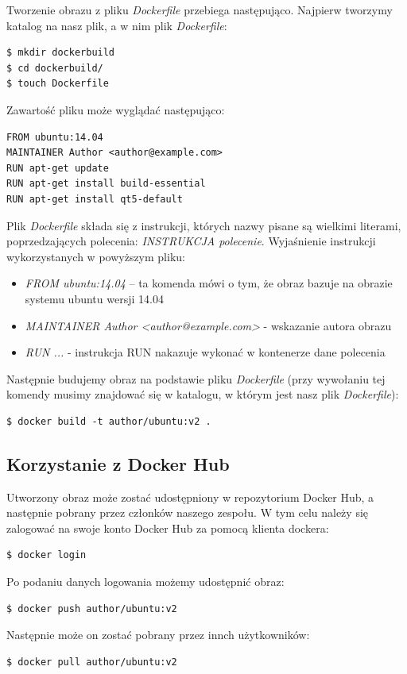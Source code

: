 Tworzenie obrazu z pliku \textit{Dockerfile} przebiega następująco. Najpierw tworzymy katalog na nasz plik, a w nim plik \textit{Dockerfile}:
\begin{lstlisting}[style=incode]
$ mkdir dockerbuild
$ cd dockerbuild/
$ touch Dockerfile
\end{lstlisting}
Zawartość pliku może wyglądać następująco:
\begin{lstlisting}[style=incode]
FROM ubuntu:14.04
MAINTAINER Author <author@example.com>
RUN apt-get update 
RUN apt-get install build-essential 
RUN apt-get install qt5-default
\end{lstlisting}
Plik \textit{Dockerfile} składa się z instrukcji, których nazwy pisane są wielkimi literami, poprzedzających polecenia: \textit{INSTRUKCJA polecenie}. Wyjaśnienie instrukcji wykorzystanych w powyższym pliku:
\begin{itemize}

\item \textit{FROM ubuntu:14.04} – ta komenda mówi o tym, że obraz bazuje na obrazie systemu ubuntu wersji 14.04
\item \textit{MAINTAINER Author <author@example.com>} - wskazanie autora obrazu
\item \textit{RUN ...} - instrukcja RUN nakazuje wykonać w kontenerze dane polecenia
\end{itemize}
Następnie budujemy obraz na podstawie pliku \textit{Dockerfile} (przy wywołaniu tej komendy musimy znajdować się w katalogu, w którym jest nasz plik \textit{Dockerfile}):
\begin{lstlisting}[style=incode]
$ docker build -t author/ubuntu:v2 .
\end{lstlisting}


\subsection{Korzystanie z Docker Hub}

Utworzony obraz może zostać udostępniony w repozytorium Docker Hub, a następnie pobrany przez członków naszego zespołu. W tym celu należy się zalogować na swoje konto Docker Hub za pomocą klienta dockera:
\begin{lstlisting}[style=incode]
$ docker login
\end{lstlisting}
Po podaniu danych logowania możemy udostępnić obraz:
\begin{lstlisting}[style=incode]
$ docker push author/ubuntu:v2
\end{lstlisting}
Następnie może on zostać pobrany przez innch użytkowników:
\begin{lstlisting}[style=incode]
$ docker pull author/ubuntu:v2
\end{lstlisting}
